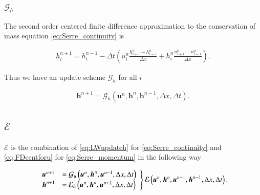 \documentclass[times]{elsarticle}
\begin{document}
\subsubsection{$\mathcal{G}_h$}
The second order centered finite difference approximation to the conservation of mass equation \eqref{eq:Serre_continuity} is
\begin{linenomath*}
	\begin{gather*}
	h^{n+1}_i = h^{n-1}_i - \Delta t \left(u^{n}_{i}\frac{h^{n}_{i+1} - h^{n}_{i-1}}{\Delta x} + h^{n}_{i}\frac{u^{n}_{i+1} - u^{n}_{i-1}}{\Delta x}\right).
	\end{gather*}
\end{linenomath*}
Thus we have an update scheme $\mathcal{G}_h$ for all $i$
\begin{linenomath*}
	\begin{gather}
	\label{eq:secondFDappformass}
	\boldsymbol{h}^{n+1} = \mathcal{G}_h\left(\boldsymbol{u}^n,\boldsymbol{h}^n,\boldsymbol{h}^{n-1} ,\Delta x, \Delta t \right).
	\end{gather}
\end{linenomath*}

\subsection{$\mathcal{E}$}
$\mathcal{E}$ is the combination of \eqref{eq:LWupdateh} for \eqref{eq:Serre_continuity} and \eqref{eq:FDcentforu} for \eqref{eq:Serre_momentum} in the following way
\begin{linenomath*}
	\begin{gather}
	\left.
	\begin{array}{l l}
	\boldsymbol{u}^{n+1}&=\mathcal{G}_u\left(\boldsymbol{u}^n,\boldsymbol{h}^n, \boldsymbol{u}^{n-1}, \Delta x, \Delta t \right) \\
	\boldsymbol{h}^{n+1}&=\mathcal{E}_h\left(\boldsymbol{u}^n,\boldsymbol{h}^n,\boldsymbol{u}^{n+1}, \Delta x, \Delta t \right)
	\end{array} \right\rbrace \mathcal{E}\left(\boldsymbol{u}^n,\boldsymbol{h}^n, \boldsymbol{u}^{n-1},\boldsymbol{h}^{n-1}, \Delta x, \Delta t \right).	 
	\end{gather}
\end{linenomath*}
\end{document}
